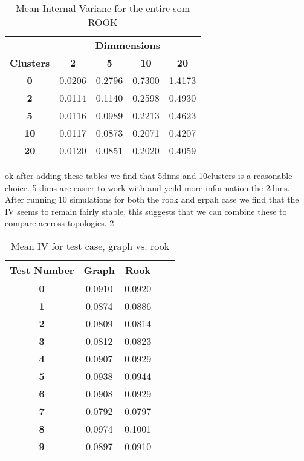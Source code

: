 \begin{table}
\caption{Mean Internal Variane for the entire som ROOK}
\label{ivtable2}
\begin{tabular}{|c||c|c|c|c|}
\hline
&\multicolumn{4}{c|}{\textbf{Dimmensions}}\\
\textbf{Clusters} & \multicolumn{1}{c}{\textbf{2}} &
\multicolumn{1}{c}{\textbf{5}} & \multicolumn{1}{c}{\textbf{10}} &
\multicolumn{1}{c|}{\textbf{20}}\\
\hline
\hline
\textbf{0} & 0.0206& 0.2796& 0.7300& 1.4173 \\
\hline
\textbf{2} & 0.0114& 0.1140& 0.2598& 0.4930 \\
\hline
\textbf{5} & 0.0116& 0.0989& 0.2213& 0.4623 \\
\hline
\textbf{10} & 0.0117& 0.0873& 0.2071& 0.4207 \\
\hline
\textbf{20} & 0.0120& 0.0851& 0.2020& 0.4059 \\
\hline
\end{tabular} \end{table}



ok after adding these tables we find that 5dims and 10clusters is a reasonable
choice. 5 dims are easier to work with and yeild more information the 2dims.
After running 10 simulations for both the rook and grpah case we find that the
IV seems to remain fairly stable, this suggests that we can combine these to
compare accross topologies.
\ref{ivtable3}

\begin{table}
\caption{Mean IV for test case, graph vs. rook}
\label{ivtable3}
\begin{tabular}{|c||c|c|c|c|}
\hline
\textbf{Test Number} & Graph & Rook \\
\hline
\hline
\textbf{0} & 0.0910 & 0.0920 \\
\hline
\textbf{1} & 0.0874 & 0.0886 \\
\hline
\textbf{2} & 0.0809 & 0.0814 \\
\hline
\textbf{3} & 0.0812 & 0.0823 \\
\hline
\textbf{4} & 0.0907 & 0.0929 \\
\hline
\textbf{5} & 0.0938 & 0.0944 \\
\hline
\textbf{6} & 0.0908 & 0.0929 \\
\hline
\textbf{7} & 0.0792 & 0.0797 \\
\hline
\textbf{8} & 0.0974 & 0.1001 \\
\hline
\textbf{9} & 0.0897 & 0.0910 \\
\hline
\end{tabular} \end{table}
